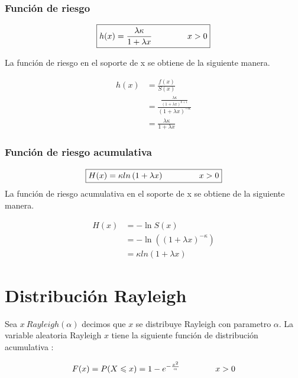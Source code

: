 \documentclass[10pt,a4paper]{article}
\begin{document}
\subsubsection*{Funci\'on de riesgo}
\begin{equation*}
\boxed{
h(x) = \frac{\lambda \kappa}{1 + \lambda x} \hspace{1.5cm} x > 0}
\end{equation*}

La función de riesgo en el soporte de x se obtiene de la siguiente manera.

\begin{align*}
h(x) &= \frac{f(x)}{S(x)} \\
     &= \frac{\frac{\lambda \kappa}{ (1+ \lambda x)^{k+1}}}{\left( 1 + \lambda x \right) ^ {-\kappa}} \\
     &= \frac{\lambda \kappa}{1 + \lambda x}
\end{align*}

\subsubsection*{Funci\'on de riesgo acumulativa}
\begin{equation*}
\boxed{
H(x) = \kappa ln \left(1 + \lambda x \right) \hspace{1.5cm} x > 0}
\end{equation*}
La función de riesgo acumulativa en el soporte de x se obtiene de la siguiente manera.

\begin{align*}
H(x) &= -\ln S(x) \\
     &= - \ln \left( \left( 1 + \lambda x \right) ^ {-\kappa} \right)  \\
     &= \kappa ln \left(1 + \lambda x \right)
\end{align*}

\section{Distribuci\'on Rayleigh}

Sea $ x ~ Rayleigh(\alpha) $ decimos que $x$ se distribuye Rayleigh con parametro $\alpha$. La variable aleatoria Rayleigh $x$ tiene la siguiente función de distribución acumulativa :

\begin{equation*}
	F(x) = P(X \leqslant x) = 1 - e^ {-\frac{x^2}{\alpha}} \hspace{1.5cm} x>0
\end{equation*}
\end{document}
